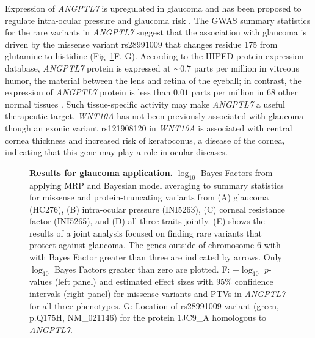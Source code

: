 Expression of \textit{ANGPTL7} is upregulated in glaucoma and has been proposed to regulate intra-ocular pressure and glaucoma risk \cite{Comes:2011ex, Kuchtey:2008ek}. The GWAS summary statistics for the rare variants in \textit{ANGPTL7} suggest that the association with glaucoma is driven by the missense variant rs28991009 that changes residue 175 from glutamine to histidine (Fig~\ref{glaucoma_bma}F, G). According to the HIPED protein expression database, \textit{ANGPTL7} protein is expressed at $\sim0.7$ parts per million in vitreous humor, the material between the lens and retina of the eyeball; in contrast, the expression of \textit{ANGPTL7} protein is less than $0.01$ parts per million in 68 other normal tissues \cite{Fishilevich:2016hx}. Such tissue-specific activity may make \textit{ANGPTL7} a useful therapeutic target. \textit{WNT10A} has not been previously associated with glaucoma though an exonic variant rs121908120 in \textit{WNT10A} is associated with central cornea thickness and increased risk of keratoconus, a disease of the cornea, indicating that this gene may play a role in ocular diseases.


\begin{figure}[!h]
\caption{{\bf Results for glaucoma application.}
$\log_{10}$ Bayes Factors from applying MRP and Bayesian model averaging to summary statistics for missense and protein-truncating variants from (A) glaucoma (HC276), (B) intra-ocular pressure (INI5263), (C) corneal resistance factor (INI5265), and (D) all three traits jointly. (E) shows the results of a joint analysis focused on finding rare variants that protect against glaucoma. The genes outside of chromosome 6 with with Bayes Factor greater than three are indicated by arrows. Only $\log_{10}$ Bayes Factors greater than zero are plotted. F: $-\log_{10}$ $p$-values (left panel) and estimated effect sizes with 95\% confidence intervals (right panel) for missense variants and PTVs in \textit{ANGPTL7} for all three phenotypes. G: Location of rs28991009 variant (green, p.Q175H, NM\_021146) for the protein 1JC9\_A homologous to \textit{ANGPTL7}.}
\label{glaucoma_bma}
\end{figure}

